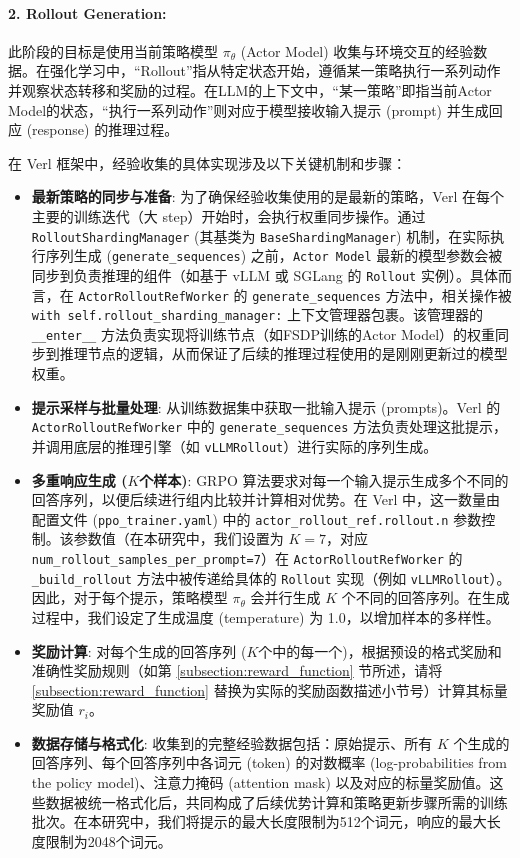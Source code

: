 \documentclass{pkuthesis}
\begin{document}
\paragraph{2. Rollout Generation:}
此阶段的目标是使用当前策略模型 $\pi_{\theta}$ (Actor Model) 收集与环境交互的经验数据。在强化学习中，“Rollout”指从特定状态开始，遵循某一策略执行一系列动作并观察状态转移和奖励的过程。在LLM的上下文中，“某一策略”即指当前Actor Model的状态，“执行一系列动作”则对应于模型接收输入提示 (prompt) 并生成回应 (response) 的推理过程。

在 Verl 框架中，经验收集的具体实现涉及以下关键机制和步骤：

\begin{itemize}
    \item \textbf{最新策略的同步与准备}:
    为了确保经验收集使用的是最新的策略，Verl 在每个主要的训练迭代（大 step）开始时，会执行权重同步操作。通过 \texttt{RolloutShardingManager} (其基类为 \texttt{BaseShardingManager}) 机制，在实际执行序列生成 (\texttt{generate\_sequences}) 之前，\texttt{Actor Model} 最新的模型参数会被同步到负责推理的组件（如基于 vLLM 或 SGLang 的 \texttt{Rollout} 实例）。具体而言，在 \texttt{ActorRolloutRefWorker} 的 \texttt{generate\_sequences} 方法中，相关操作被 \texttt{with self.rollout\_sharding\_manager:} 上下文管理器包裹。该管理器的 \texttt{\_\_enter\_\_} 方法负责实现将训练节点（如FSDP训练的Actor Model）的权重同步到推理节点的逻辑，从而保证了后续的推理过程使用的是刚刚更新过的模型权重。

    \item \textbf{提示采样与批量处理}:
    从训练数据集中获取一批输入提示 (prompts)。Verl 的 \texttt{ActorRolloutRefWorker} 中的 \texttt{generate\_sequences} 方法负责处理这批提示，并调用底层的推理引擎（如 \texttt{vLLMRollout}）进行实际的序列生成。

    \item \textbf{多重响应生成 ($K$个样本)}:
    GRPO 算法要求对每一个输入提示生成多个不同的回答序列，以便后续进行组内比较并计算相对优势。在 Verl 中，这一数量由配置文件 (\texttt{ppo\_trainer.yaml}) 中的 \texttt{actor\_rollout\_ref.rollout.n} 参数控制。该参数值（在本研究中，我们设置为 $K=7$，对应 \texttt{num\_rollout\_samples\_per\_prompt=7}）在 \texttt{ActorRolloutRefWorker} 的 \texttt{\_build\_rollout} 方法中被传递给具体的 \texttt{Rollout} 实现（例如 \texttt{vLLMRollout}）。因此，对于每个提示，策略模型 $\pi_{\theta}$ 会并行生成 $K$ 个不同的回答序列。在生成过程中，我们设定了生成温度 (temperature) 为 1.0，以增加样本的多样性。

    \item \textbf{奖励计算}:
    对每个生成的回答序列 ($K$个中的每一个)，根据预设的格式奖励和准确性奖励规则（如第 \ref{subsection:reward_function} 节所述，请将 \ref{subsection:reward_function} 替换为实际的奖励函数描述小节号）计算其标量奖励值 $r_i$。

    \item \textbf{数据存储与格式化}:
    收集到的完整经验数据包括：原始提示、所有 $K$ 个生成的回答序列、每个回答序列中各词元 (token) 的对数概率 (log-probabilities from the policy model)、注意力掩码 (attention mask) 以及对应的标量奖励值。这些数据被统一格式化后，共同构成了后续优势计算和策略更新步骤所需的训练批次。在本研究中，我们将提示的最大长度限制为512个词元，响应的最大长度限制为2048个词元。
\end{itemize}
\end{document}
